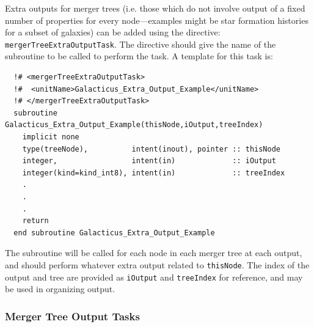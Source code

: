 Extra outputs for merger trees (i.e. those which do not involve output of a fixed number of properties for every node---examples might be star formation histories for a subset of galaxies) can be added using the directive: {\tt mergerTreeExtraOutputTask}. The directive should give the name of the subroutine to be called to perform the task. A template for this task is:
\begin{verbatim}
  !# <mergerTreeExtraOutputTask>
  !#  <unitName>Galacticus_Extra_Output_Example</unitName>
  !# </mergerTreeExtraOutputTask>
  subroutine Galacticus_Extra_Output_Example(thisNode,iOutput,treeIndex)
    implicit none
    type(treeNode),          intent(inout), pointer :: thisNode
    integer,                 intent(in)             :: iOutput
    integer(kind=kind_int8), intent(in)             :: treeIndex
    .
    .
    .
    return
  end subroutine Galacticus_Extra_Output_Example
\end{verbatim}
The subroutine will be called for each node in each merger tree at each output, and should perform whatever extra output related to {\tt thisNode}. The index of the output and tree are provided as {\tt iOutput} and {\tt treeIndex} for reference, and may be used in organizing output.

\subsubsection{Merger Tree Output Tasks}

